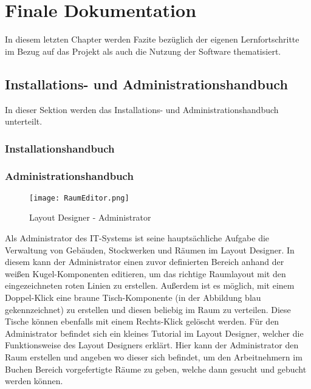\chapter{Finale Dokumentation}

In diesem letzten Chapter werden Fazite bezüglich der eigenen Lernfortschritte im Bezug auf das Projekt als auch die Nutzung der Software thematisiert.

\section{Installations- und Administrationshandbuch}

In dieser Sektion werden das Installations- und Administrationshandbuch unterteilt.

\subsection{Installationshandbuch}


\subsection{Administrationshandbuch}

\begin{figure}[!h]
    \centering
    \texttt{[image: RaumEditor.png]}
    \caption{Layout Designer - Administrator}
    \label{fig:LayoutDesigner}
\end{figure}

Als Administrator des IT-Systems ist seine hauptsächliche Aufgabe die Verwaltung von Gebäuden, Stockwerken und Räumen im Layout Designer.
In diesem kann der Administrator einen zuvor definierten Bereich anhand der weißen Kugel-Komponenten editieren, um das richtige Raumlayout mit den eingezeichneten roten Linien zu erstellen.
Außerdem ist es möglich, mit einem Doppel-Klick eine braune Tisch-Komponente (in der Abbildung blau gekennzeichnet) zu erstellen und diesen beliebig im Raum zu verteilen.
Diese Tische können ebenfalls mit einem Rechts-Klick gelöscht werden.
Für den Administrator befindet sich ein kleines Tutorial im Layout Designer, welcher die Funktionsweise des Layout Designers erklärt.
Hier kann der Administrator den Raum erstellen und angeben wo dieser sich befindet, um den Arbeitnehmern im Buchen Bereich vorgefertigte Räume zu geben, welche dann gesucht und gebucht werden können.

\pagebreak

